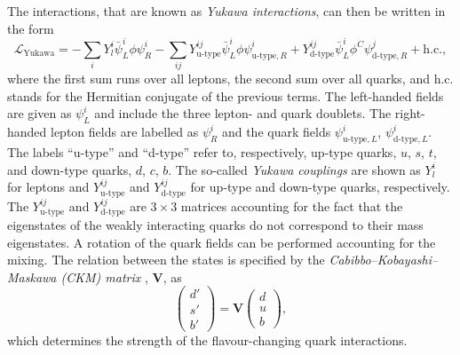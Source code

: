 The interactions, that are known as \emph{Yukawa interactions}, can then be written in the form
\begin{equation}
  \mathcal{L}_\text{Yukawa} = - \sum_{i} Y_l^i \bar{\psi}^{i}_{L} \phi \psi^{i}_{R} - \sum_{ij} Y_{\text{u-type}}^{ij} \bar{\psi}^{i}_{L} \phi \psi^{i}_{\text{u-type},R} + Y_{\text{d-type}}^{ij} \bar{\psi}^{i}_{L} \phi^C \psi^{j}_{\text{d-type}, R} + \text{h.c.}, 
  \label{eq:lyukawa}
\end{equation}
where the first sum runs over all leptons, the second sum over all quarks, and h.c. stands for the Hermitian conjugate of the previous terms.
The left-handed fields are given as $\psi^{i}_{L}$ and include the three lepton- and quark doublets. 
The right-handed lepton fields are labelled as $\psi_R^i$ and the quark fields $\psi^{i}_{\text{u-type},L}$, $\psi^{i}_{\text{d-type},L}$.
The labels ``u-type'' and ``d-type'' refer to, respectively, up-type quarks, $u$, $s$, $t$, and down-type quarks, $d$, $c$, $b$. 
The so-called \emph{Yukawa couplings} are shown as $Y_l^i$ for leptons and $Y_{\text{u-type}}^{ij}$ and $Y_{\text{d-type}}^{ij}$ for up-type and down-type quarks, respectively. The $Y_{\text{u-type}}^{ij}$ and $Y_{\text{d-type}}^{ij}$ are $3 \times 3$ matrices accounting for the fact that the eigenstates of the weakly interacting quarks do not correspond to their mass eigenstates. A rotation of the quark fields can be performed accounting for the mixing. 
The relation between the states is specified by the \emph{Cabibbo–Kobayashi–Maskawa (CKM) matrix} \cite{doi:10.1143/PTP.49.652}, $\pmb{V}$, as
\begin{equation}
  \begin{pmatrix}
   d' \\
   s' \\
   b'
 \end{pmatrix}
 = 
 \pmb{V} 
 \begin{pmatrix}
   d \\
   u \\
   b
 \end{pmatrix}, 
\end{equation}
which determines the strength of the flavour-changing quark interactions.


